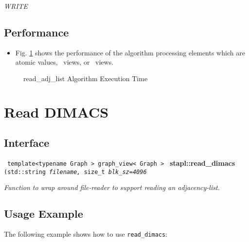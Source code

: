 \textit{WRITE}

\subsection{Performance} \label{sec-rd-adj-list-alg-perf}

\begin{itemize}
\item
Fig. \ref{fig:rd-adj-list-alg-exec-exper}
shows the performance of the algorithm processing
elements which are atomic values, \stl\ views, or \stapl\ views.
\end{itemize}

\begin{figure}[p]
\caption{ read\_adj\_list Algorithm Execution Time}
\label{fig:rd-adj-list-alg-exec-exper}
\end{figure}


\section{Read DIMACS}
\label{sec-read-dimacs-alg}

\subsection{Interface} \label{sec-read-dimacs-alg-inter}

\noindent
\texttt{%
template<typename Graph >
\newline
graph\_view< Graph >
}
\newline
\textbf{stapl::read\_dimacs}%
\newline
\texttt{%
(std::string 
\textit{filename,}%
size\_t 
\textit{blk\_sz=4096}%
}
\vspace{0.4cm}

\textit{
Function to wrap around file-reader to support reading an adjacency-list. 
}
\vspace{0.4cm}

\subsection{Usage Example} \label{sec-read-dimacs-alg-use}

The following example shows how to use 
\texttt{read\_dimacs}:



